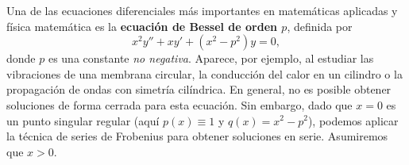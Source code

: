  
\makeatletter
\ifdefined\bbereffixdone\else
  \def\bbereffixdone{}
\fi
\makeatother
 
\providecommand{\bbezero}[2]{\addplot[bbegray!70, thin, forget plot] coordinates {(#1,0) (#2,0)};}
 
 
Una de las ecuaciones diferenciales más importantes en matemáticas aplicadas y física matemática es la \textbf{ecuación de Bessel de orden $p$}, definida por
\begin{equation}
x^2 y'' + xy' + (x^2 - p^2)y = 0,
\label{eq:s5-bessel}
\end{equation}
donde $p$ es una constante \textit{no negativa}. Aparece, por ejemplo, al estudiar las vibraciones de una membrana circular, la conducción del calor en un cilindro o la propagación de ondas con simetría cilíndrica. En general, no es posible obtener soluciones de forma cerrada para esta ecuación. Sin embargo, dado que $x = 0$ es un punto singular regular (aquí $p(x)\equiv1$ y $q(x)=x^2-p^2$), podemos aplicar la técnica de series de Frobenius para obtener soluciones en serie. Asumiremos que $x > 0$.
 
